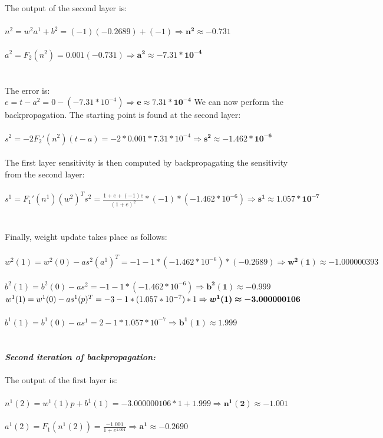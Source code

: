 \documentclass{article}
\begin{document}
\noindent \\ \\The output of the second layer is: \\ \\$n^2 = w^2a^1 + b^2 = (-1)(-0.2689) + (-1) \Rightarrow \bm{n^2 \approx -0.731}$
\\ \\$a^2 = F_2(n^2) = 0.001(-0.731) \Rightarrow \bm{a^2 \approx -7.31 * 10^{-4}}$
\\ \\ \\The error is: \\$e = t - a^2 = 0 - (-7.31 * 10^{-4}) \Rightarrow \bm{e \approx 7.31 * 10^{-4}}$ 
\newpage 
\noindent We can now perform the backpropagation. The starting point is found at the second layer: \\ \\
$s^2 = -2F_2'(n^2)(t-a) = -2 * 0.001 * 7.31 * 10^{-4} \Rightarrow \bm{s^2 \approx -1.462 * 10^{-6}}$
\\\\ The first layer sensitivity is then computed by backpropagating the sensitivity from the second layer: \\ \\ $s^1 = F_1'(n^1)(w^2)^Ts^2 = \frac{1+e+(-1)e}{(1+e)^2} * (-1) *(-1.462 * 10^{-6}) \Rightarrow \bm{s^1 \approx 1.057 * 10^{-7}}$
\\\\ \\Finally, weight update takes place as follows: \\\\
$w^2(1) = w^2(0) - as^2(a^1)^T = -1 -1 * (-1.462 * 10 ^{-6}) * (-0.2689) \Rightarrow \bm{w^2(1) \approx -1.000000393}$
\\ \\ $b^2(1) = b^2(0) -as^2 = -1 -1 * (-1.462 * 10 ^ {-6}) \Rightarrow \bm{b^2(1) \approx -0.999}$
$\\ \\ \\ w^1(1) = w^1(0) -as^1(p)^T = -3 -1 * (1.057 * 10^{-7}) * 1 \Rightarrow \bm{w^1(1) \approx -3.000000106} $ 
\\ \\$b^1(1) = b^1(0) - as^1 = 2 - 1 * 1.057 * 10^{-7} \Rightarrow \bm{b^1(1) \approx 1.999}$\\ \\ \\

\noindent \textbf{\textit{Second iteration of backpropagation:}}
\noindent \\ \\The output of the first layer is: \\ \\$n^1(2) = w^1(1)p + b^1(1) = -3.000000106 * 1 + 1.999\Rightarrow \bm{n^1(2) \approx -1.001}$
\\ \\$a^1(2) = F_1(n^1(2)) = \frac{-1.001}{1+e^{1.001}} \Rightarrow \bm{a^1 \approx -0.2690}$
\end{document}
